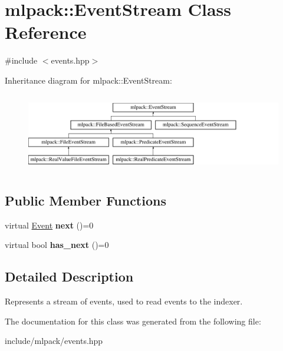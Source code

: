 \hypertarget{classmlpack_1_1_event_stream}{
\section{mlpack::EventStream Class Reference}
\label{classmlpack_1_1_event_stream}
}


{\ttfamily \#include $<$events.hpp$>$}

Inheritance diagram for mlpack::EventStream:\begin{figure}[H]
\begin{center}
\leavevmode
\includegraphics[height=3.472868cm]{classmlpack_1_1_event_stream}
\end{center}
\end{figure}
\subsection*{Public Member Functions}
\begin{DoxyCompactItemize}
\item 
\hypertarget{classmlpack_1_1_event_stream_aa3b7f54240069f28f60d3e99b125f990}{
virtual \hyperlink{structmlpack_1_1_event}{Event} {\bfseries next} ()=0}
\label{classmlpack_1_1_event_stream_aa3b7f54240069f28f60d3e99b125f990}

\item 
\hypertarget{classmlpack_1_1_event_stream_ae53414a60c19d80291d9f76168160497}{
virtual bool {\bfseries has\_\-next} ()=0}
\label{classmlpack_1_1_event_stream_ae53414a60c19d80291d9f76168160497}

\end{DoxyCompactItemize}


\subsection{Detailed Description}
Represents a stream of events, used to read events to the indexer. 

The documentation for this class was generated from the following file:\begin{DoxyCompactItemize}
\item 
include/mlpack/events.hpp\end{DoxyCompactItemize}
